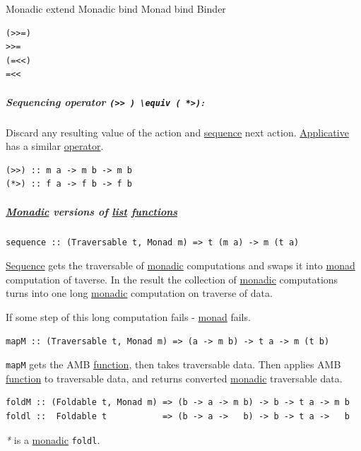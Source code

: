 \documentclass[a4paper,14pt,oneside]{book}
\begin{document}
\label{org3d9c1e7}Monadic extend
\label{org17123ea}Monadic bind
\label{org20f75cc}Monad bind
\label{orgce73a90}Binder

\begin{verbatim}
(>>=)
>>=
(=<<)
=<<
\end{verbatim}




\subparagraph{\label{org21312c3}Sequencing operator \texttt{(>> ) \textbackslash{}equiv ( *>)}:}
\label{sec:org4f5f6c4}
Discard any resulting value of the action and \hyperref[org050e008]{sequence} next action.
\hyperref[org833245f]{Applicative} has a similar \hyperref[org10c7e87]{operator}.
\begin{verbatim}
(>>) :: m a -> m b -> m b
(*>) :: f a -> f b -> f b
\end{verbatim}

\subparagraph{\hyperref[orgc382ab8]{Monadic} versions of \hyperref[org2a04873]{list} \hyperref[org8ad6eae]{functions}}
\label{sec:org9d006cc}
\begin{verbatim}
sequence :: (Traversable t, Monad m) => t (m a) -> m (t a)
\end{verbatim}

\hyperref[org050e008]{Sequence} gets the traversable of \hyperref[orgc382ab8]{monadic} computations and swaps it into \hyperref[org7f47037]{monad} computation of taverse. In the result the collection of \hyperref[orgc382ab8]{monadic} computations turns into one long \hyperref[orgc382ab8]{monadic} computation on traverse of data.

If some step of this long computation fails - \hyperref[org7f47037]{monad} fails.

\begin{verbatim}
mapM :: (Traversable t, Monad m) => (a -> m b) -> t a -> m (t b)
\end{verbatim}

\texttt{mapM} gets the AMB \hyperref[org8ffa6fa]{function}, then takes traversable data. Then applies AMB \hyperref[org8ffa6fa]{function} to traversable data, and returns converted \hyperref[orgc382ab8]{monadic} traversable data.

\begin{verbatim}
foldM :: (Foldable t, Monad m) => (b -> a -> m b) -> b -> t a -> m b
foldl ::  Foldable t           => (b -> a ->   b) -> b -> t a ->   b
\end{verbatim}

\emph{*} is a \hyperref[orgc382ab8]{monadic} \texttt{foldl}.
\end{document}
